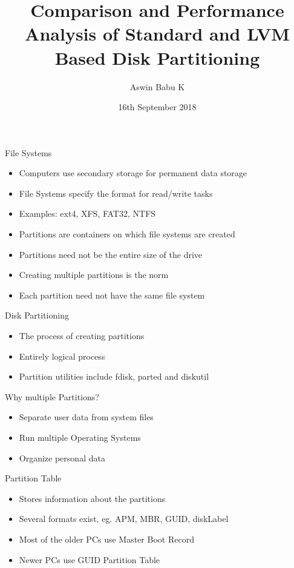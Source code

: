 \documentclass{beamer}
\title[Your Short Title]{Comparison and Performance Analysis of Standard and
LVM Based Disk Partitioning}
\author{Aswin Babu K}
\institute{College of Engineering Trivandrum}
\date{16th September 2018}
\begin{document}
\begin{frame}
    \titlepage
\end{frame}

\begin{frame}{File Systems}
    \begin{itemize}
        \item<2-> Computers use secondary storage for permanent data storage
        \item<3-> File Systems specify the format for read/write tasks
        \item<4-> Examples: ext4, XFS, FAT32, NTFS
        \item<5-> Partitions are containers on which file systems are created
        \item<6-> Partitions need not be the entire size of the drive
        \item<7-> Creating multiple partitions is the norm
        \item<8-> Each partition need not have the same file system
    \end{itemize}
\end{frame}

\begin{frame}{Disk Partitioning}
    \begin{itemize}
        \item<2-> The process of creating partitions
        \item<3-> Entirely logical process
        \item<4-> Partition utilities include fdisk, parted and diskutil
    \end{itemize}
\end{frame}

\begin{frame}{Why multiple Partitions?}
    \begin{itemize}
        \item<2-> Separate user data from system files
        \item<3-> Run multiple Operating Systems
        \item<4-> Organize personal data
    \end{itemize}
\end{frame}

\begin{frame}{Partition Table}
    \begin{itemize}
        \item<2-> Stores information about the partitions
        \item<3-> Several formats exist, eg. APM, MBR, GUID, diskLabel
        \item<4-> Most of the older PCs use Master Boot Record
        \item<5-> Newer PCs use GUID Partition Table
    \end{itemize}
\end{frame}
\end{document}
